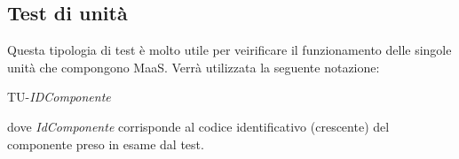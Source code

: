 \newpage
\subsection{Test di unità}
Questa tipologia di test è molto utile per veirificare il funzionamento delle singole unità che compongono MaaS.
Verrà utilizzata la seguente notazione:
	\begin{center}
		TU-\textit{IDComponente}
	\end{center}
dove \textit{IdComponente} corrisponde al codice identificativo (crescente) del componente preso in esame dal test.




 
%

